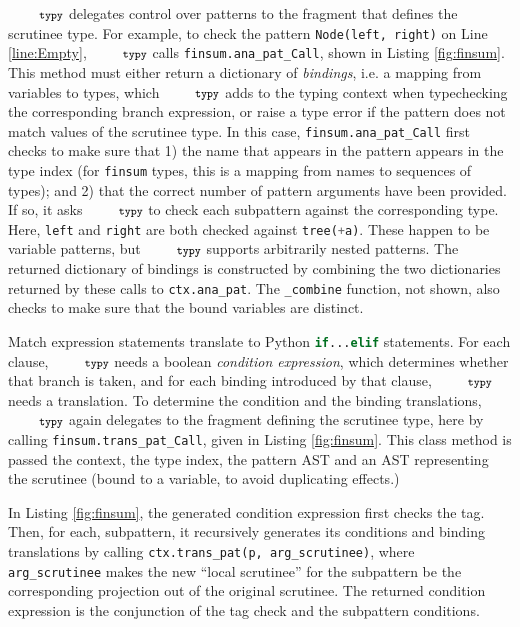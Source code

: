 \documentclass[10pt]{sigplanconf}
\newcommand{\typy}{\texttt{\footnotesize typy}}
\newcommand{\lip}[1]{\lstinline[language=Python,basicstyle=\ttfamily\footnotesize,morekeywords={with},deletendkeywords={tuple,buffer,map}]{#1}}
\newcommand{\li}[1]{\lip{#1}}
\begin{document}
$\typy$ delegates control over patterns to the fragment that defines the scrutinee type. For example, to check the pattern \li{Node(left, right)} on Line \ref{line:Empty}, $\typy$ calls \li{finsum.ana_pat_Call}, shown in Listing \ref{fig:finsum}. This method must either return a dictionary of \emph{bindings}, i.e. a mapping from variables to types, which $\typy$ adds to the typing context when typechecking the corresponding branch expression, or raise a type error if the pattern does not match values of the scrutinee type. In this case, \li{finsum.ana_pat_Call} first checks to make sure that 1) the name that appears in the pattern appears in the type index (for \li{finsum} types, this is a mapping from names to sequences of types); and 2) that the correct number of pattern arguments have been provided. If so, it asks $\typy$ to check each subpattern against the corresponding type. Here, \li{left} and \li{right} are both checked against \li{tree(+a)}. These happen to be variable patterns, but $\typy$ supports arbitrarily nested patterns. The returned dictionary of bindings is constructed by combining the two dictionaries returned by these calls to \li{ctx.ana_pat}. The \li{_combine} function, not shown, also checks to make sure that the bound variables are distinct.



Match expression statements translate to Python \li{if...elif} statements. For each clause, $\typy$ needs a boolean \emph{condition expression}, which determines whether that branch is taken, and for each binding introduced by that clause, $\typy$ needs a translation. To determine the condition and the binding translations, $\typy$ again delegates to the fragment defining the scrutinee type, here by calling \li{finsum.trans_pat_Call}, given in Listing \ref{fig:finsum}. This class method is passed the context, the type index, the pattern AST and an AST representing the scrutinee (bound to a variable, to avoid duplicating effects.) 

In Listing \ref{fig:finsum}, the generated condition expression first checks the tag. Then, for each, subpattern, it recursively generates its conditions and binding translations by calling \li{ctx.trans_pat(p, arg_scrutinee)}, where \li{arg_scrutinee} makes the new ``local scrutinee'' for the subpattern be the corresponding projection out of the original scrutinee. The returned condition expression is the conjunction of the tag check and the subpattern conditions. %
\end{document}
